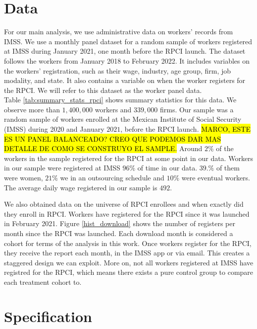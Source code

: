 \documentclass[oneside,11pt]{article}
\begin{document}
\section{Data} \label{data}


For our main analysis, we use administrative data on workers' records from IMSS. We use a monthly panel dataset for a random sample of workers registered at IMSS during January 2021, one month before the RPCI launch. The dataset follows the workers from January 2018 to February 2022. It includes variables on the workers' registration, such as their wage, industry, age group, firm, job modality, and state. It also contains a variable on when the worker registers for the RPCI. We will refer to this dataset as the worker panel data. \\ 

Table \ref{tab:summary_stats_rpci} shows summary statistics for this data. We observe more than $1,400,000$ workers and $339,000$ firms. Our sample was a random sample of workers enrolled at the Mexican Institute of Social Security (IMSS) during 2020 and January $2021$, before the RPCI launch. \hl{MARCO, ESTE ES UN PANEL BALANCEADO? CREO QUE PODEMOS DAR MAS DETALLE DE COMO SE CONSTRUYO EL SAMPLE.} Around $2\%$ of the workers in the sample registered for the RPCI at some point in our data. Workers in our sample were registered at IMSS $96\%$ of time in our data. $39.\%$ of them were women, $21\%$ we in an outsourcing schedule and $10\%$ were eventual workers. The average daily wage registered in our sample is $492$. 

We also obtained data on the universe of RPCI enrollees and when exactly did they enroll in RPCI.  Workers have registered for the RPCI since it was launched in February 2021. Figure \ref{hist_download} shows the number of registers per month since the RPCI was launched. Each download month is considered a cohort for terms of the analysis in this work. Once workers register for the RPCI, they receive the report each month, in the IMSS app or via email. This creates a staggered design we can exploit. More on, not all workers registered at IMSS have registred for the RPCI, which means there exists a pure control group to compare each treatment cohort to. 



\section{Specification} \label{specification}
\end{document}
